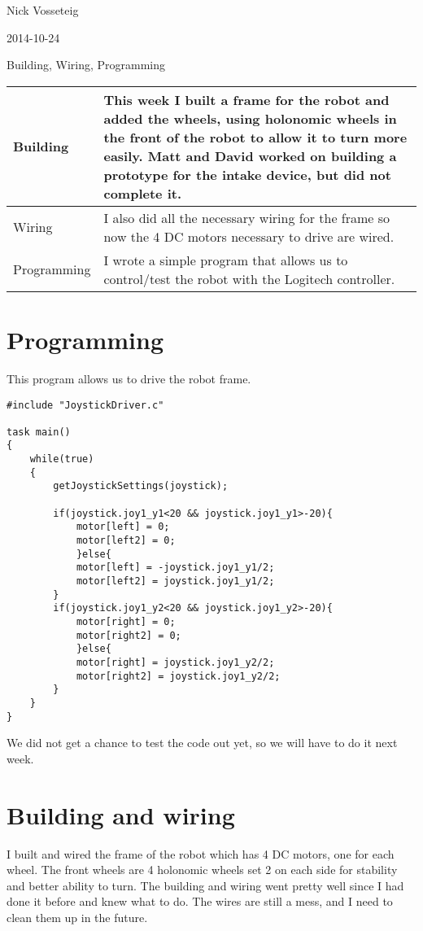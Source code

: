 Nick Vosseteig

2014-10-24

Building, Wiring, Programming

\begin{tabular}{|p{5cm}|p{5cm}|}
 \hline
 Building&
This week I built a frame for the robot and added the wheels, using holonomic wheels in the front of the robot to allow it to turn more easily. Matt and David worked on building a prototype for the intake device, but did not complete it. 
 \\
 \hline
Wiring&
I also did all the necessary wiring for the frame so now the 4 DC motors necessary to drive are wired.
 \\
 \hline
Programming& I wrote a simple program that allows us to control/test the robot with the Logitech controller.
 \\
 \hline
\end{tabular}

\section*{Programming}
This program allows us to drive the robot frame.
\begin{lstlisting}[style = RobotC]	
#include "JoystickDriver.c"

task main()
{
	while(true)
	{
		getJoystickSettings(joystick);

		if(joystick.joy1_y1<20 && joystick.joy1_y1>-20){
			motor[left] = 0;
			motor[left2] = 0;
			}else{
			motor[left] = -joystick.joy1_y1/2;
			motor[left2] = joystick.joy1_y1/2;
		}
		if(joystick.joy1_y2<20 && joystick.joy1_y2>-20){
			motor[right] = 0;
			motor[right2] = 0;
			}else{
			motor[right] = joystick.joy1_y2/2;
			motor[right2] = joystick.joy1_y2/2;
		}
	}
}
\end{lstlisting}
We did not get a chance to test the code out yet, so we will have to do it next week.

\section*{Building and wiring}
I built and wired the frame of the robot which has 4 DC motors, one for each wheel. The front wheels are 4 holonomic wheels set 2 on each side for stability and better ability to turn. The building and wiring went pretty well since I had done it before and knew what to do. The wires are still a mess, and I need to clean them up in the future.
